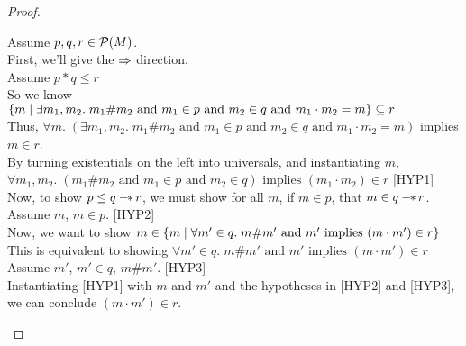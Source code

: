 \begin{proof}
\begin{enumerate}
  \begin{tabbedproof}
    Assume $p, q, r \in \mathcal{P}(M)$. \\
    \oo First, we'll give the $\Rightarrow$ direction. \\
    \ooo Assume $p * q \leq r$ \\
    \ooo So we know 
          $\{{{m}\;|\;{\exists m_1, m_2.\; m_1 \# m_2 \mbox{ and } m_1 \in p \mbox{ and } m_2 \in q 
                                             \mbox{ and } m_1 \cdot m_2 = m}}\}
           \subseteq r$ \\
    \ooo Thus, $\forall m.\; (\exists m_1, m_2.\; m_1 \# m_2 \mbox{ and } m_1 \in p \mbox{ and } m_2 \in q 
                                             \mbox{ and } m_1 \cdot m_2 = m)$ implies $m \in r$. \\
    \ooo By turning existentials on the left into universals, and instantiating $m$, \\
    \oooo
             $\forall m_1, m_2.\; (m_1 \# m_2 \mbox{ and } m_1 \in p \mbox{ and } m_2 \in q) \mbox{ implies } (m_1 \cdot m_2) \in r$ [HYP1] \\
    \ooo Now, to show $p \leq q -\!\!*\, r$, we must show
         for all $m$, if $m \in p$, that $m \in q -\!\!*\, r$. \\
    \ooo Assume $m$, $m \in p$. [HYP2] \\
    \oooo Now, we want to show $m \in \{{{m}\;|\;{\forall m' \in q.\; m\# m' \mbox{ and } m' \mbox{ implies } (m \cdot m') \in r}}\}$ \\
    \oooo This is equivalent to showing $\forall m' \in q.\; m\# m' \mbox{ and } m' \mbox{ implies } (m \cdot m') \in r$ \\
    \oooo Assume $m'$, $m' \in q$, $m \# m'$. [HYP3] \\ 
    \ooooo Instantiating [HYP1] with $m$ and $m'$ and the hypotheses in [HYP2] and [HYP3], \\
    \ooooo we can conclude $(m \cdot m') \in r$.  \\


\end{tabbedproof}
\end{enumerate}
\end{proof}

